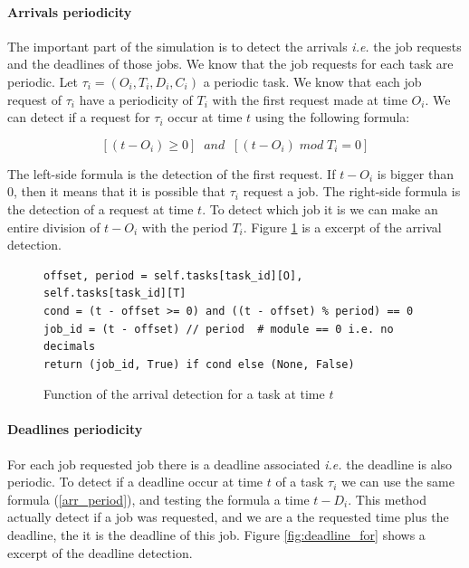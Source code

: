 \documentclass[letterpaper]{article}
\begin{document}
\paragraph{Arrivals periodicity}

The important part of the simulation is to detect the arrivals \textit{i.e.}
the job requests and the deadlines of those jobs. We know that
the job requests for each task are periodic.
Let $\tau_i = (O_i, T_i, D_i, C_i)$ a periodic task. We know that each
job request of $\tau_i$ have a periodicity of $T_i$ with the first request
made at time $O_i$. We can detect if a request for $\tau_i$ occur at time
$t$ using the following formula:

\begin{equation}
  \label{arr_period}
  [(t - O_i) \ge 0] \;\; and \;\; [(t - O_i) \; mod \; T_i = 0]
\end{equation}

The left-side formula is the detection of the first request. If $t - O_i$
is bigger than 0,
then it means that it is possible that $\tau_i$ request a job.
The right-side formula is the detection of a request at time $t$. To detect
which job it is we can make an entire division of $t - O_i$ with
the period $T_i$. Figure \ref{fig:arrival_for} is a excerpt of the arrival
detection.

\begin{figure}[H]
    \begin{lstlisting}
offset, period = self.tasks[task_id][O], self.tasks[task_id][T]
cond = (t - offset >= 0) and ((t - offset) % period) == 0
job_id = (t - offset) // period  # module == 0 i.e. no decimals
return (job_id, True) if cond else (None, False)
    \end{lstlisting}
    \caption{Function of the arrival detection for a task at time $t$}
    \label{fig:arrival_for}
\end{figure}

\paragraph{Deadlines periodicity}

For each job requested job there is a deadline associated \textit{i.e.}
the deadline is also periodic. To detect if a deadline occur at time $t$
of a task $\tau_i$ we can use the same formula (\ref{arr_period}), and
testing the formula a time $t - D_i$. This method actually detect if
a job was requested, and we are a the requested time plus the deadline, the
it is the deadline of this job. Figure \ref{fig:deadline_for} shows
a excerpt of the deadline detection.
\end{document}
